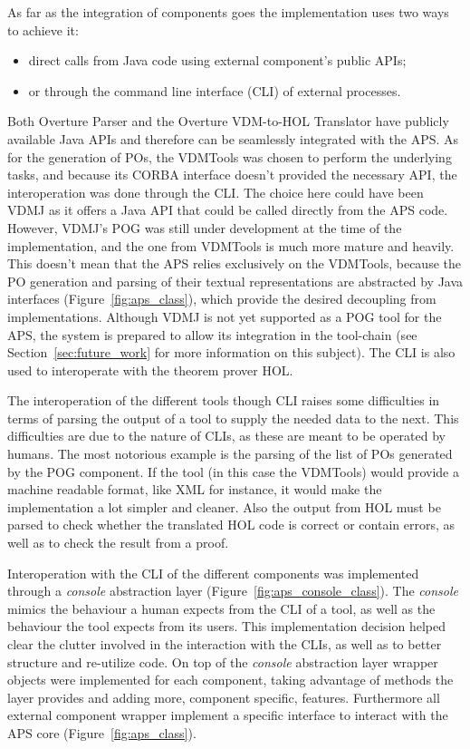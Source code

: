 \documentclass[]{article}
\begin{document}
As far as the integration of components goes the implementation uses two ways to achieve it:
\begin{itemize}
  \item direct calls from Java code using external component's public APIs;
  \item or through the command line interface (CLI) of external processes.
\end{itemize}

Both Overture Parser and the Overture VDM-to-HOL Translator have publicly available Java APIs and therefore can be seamlessly integrated with the APS.
As for the generation of POs, the VDMTools was chosen to perform the underlying tasks, and because its CORBA interface doesn't provided the necessary API, the interoperation was done through the CLI.
The choice here could have been VDMJ as it offers a Java API that could be called directly from the APS code.
However, VDMJ's POG was still under development at the time of the implementation, and the one from VDMTools is much more mature and heavily.
This doesn't mean that the APS relies exclusively on the VDMTools, because the PO generation and parsing of their textual representations are abstracted by Java interfaces (Figure~\ref{fig:aps_class}), which provide the desired decoupling from implementations.
Although VDMJ is not yet supported as a POG tool for the APS, the system is prepared to allow its integration in the tool-chain (see Section~\ref{sec:future_work} for more information on this subject).
The CLI is also used to interoperate with the theorem prover HOL.

The interoperation of the different tools though CLI raises some difficulties in terms of parsing the output of a tool to supply the needed data to the next.
This difficulties are due to the nature of CLIs, as these are meant to be operated by humans.
The most notorious example is the parsing of the list of POs generated by the POG component.
If the tool (in this case the VDMTools) would provide a machine readable format, like XML for instance, it would make the implementation a lot simpler and cleaner.
Also the output from HOL must be parsed to check whether the translated HOL code is correct or contain errors, as well as to check the result from a  proof.

Interoperation with the CLI of the different components was implemented through a \emph{console} abstraction layer (Figure~\ref{fig:aps_console_class}).
The \emph{console} mimics the behaviour a human expects from the CLI of a tool, as well as the behaviour the tool expects from its users.
This implementation decision helped clear the clutter involved in the interaction with the CLIs, as well as to better structure and re-utilize code.
On top of the \emph{console} abstraction layer wrapper objects were implemented for each component, taking advantage of methods the layer provides and adding more, component specific, features.
Furthermore all external component wrapper implement a specific interface to interact with the APS core (Figure~\ref{fig:aps_class}).
\end{document}
